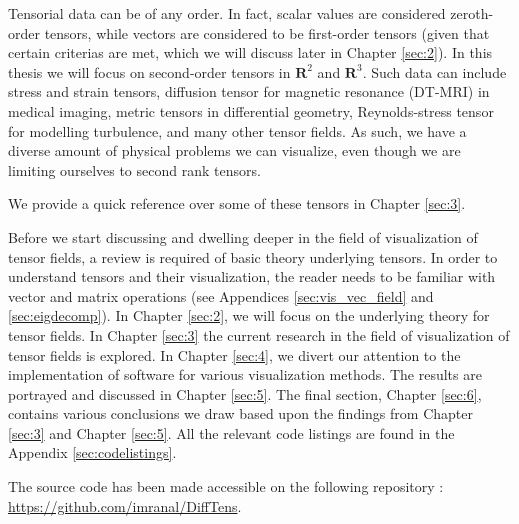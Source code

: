 \documentclass[main.tex]{subfiles}
\begin{document}
Tensorial data can be of any order. In fact, scalar values are considered zeroth-order tensors, 
while vectors are considered to be first-order tensors (given that certain criterias are met, 
which we will discuss later in Chapter \ref{sec:2}). In this thesis we will focus on second-order 
tensors in $\mathbf{R}^2$ and $\mathbf{R}^3$. Such data can include stress and strain 
tensors, diffusion tensor for magnetic resonance (DT-MRI) in medical imaging, metric 
tensors in differential geometry, Reynolds-stress tensor for modelling turbulence, and 
many other tensor fields. As such, we have a diverse amount of physical problems we 
can visualize, even though we are limiting ourselves to second rank tensors.

We provide a quick reference over some of these tensors in Chapter \ref{sec:3}.


\vspace{5mm}Before we start discussing and dwelling deeper in the field of visualization of
tensor fields, a review is required of basic theory underlying tensors.
In order to understand tensors and their visualization, the 
reader needs to be familiar with vector and matrix operations (see Appendices 
\ref{sec:vis_vec_field} and \ref{sec:eigdecomp}). In Chapter \ref{sec:2},
we will focus on the underlying theory for tensor fields. In Chapter \ref{sec:3} the 
current research in the field of visualization of tensor fields is explored. In  
Chapter \ref{sec:4}, we divert our attention to the implementation of software for
various visualization methods. The results are portrayed and discussed in Chapter 
\ref{sec:5}. The final section, Chapter \ref{sec:6}, contains various conclusions
we draw based upon the findings from Chapter \ref{sec:3} and Chapter \ref{sec:5}.
All the relevant code listings are found in the Appendix \ref{sec:codelistings}.

The source code has been made accessible on the following repository : \url{https://github.com/imranal/DiffTens}.
\end{document}
